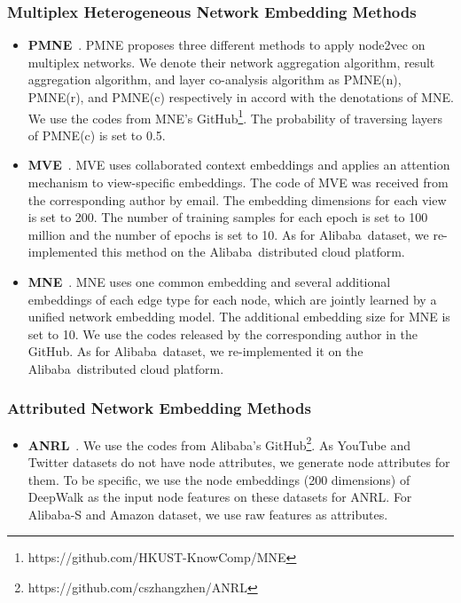 \documentclass[sigconf]{acmart}
\newcommand{\company}{Alibaba}
\begin{document}
\subsubsection{Multiplex Heterogeneous Network Embedding Methods}
\begin{itemize}
  \item \textbf{PMNE}~\cite{liu2017principled}. PMNE proposes three different methods to apply node2vec on multiplex networks. We denote their network aggregation algorithm, result aggregation algorithm, and layer co-analysis algorithm as PMNE(n), PMNE(r), and PMNE(c) respectively in accord with the denotations of MNE\cite{ijcai2018-428}. We use the codes from MNE's GitHub\footnote{\label{fn:mne}https://github.com/HKUST-KnowComp/MNE}. The probability of traversing layers of PMNE(c) is set to 0.5. 
  \item \textbf{MVE}~\cite{qu2017attention}. MVE uses collaborated context embeddings and applies an attention mechanism to view-specific embeddings. The code of MVE was received from the corresponding author by email. The embedding dimensions for each view is set to 200. The number of training samples for each epoch is set to 100 million and the number of epochs is set to 10. As for \company\ dataset, we re-implemented this method on the \company\ distributed cloud platform. 
\item \textbf{MNE}~\cite{ijcai2018-428}. MNE uses one common embedding and several additional embeddings of each edge type for each node, which are jointly learned by a unified network embedding model. The additional embedding size for MNE is set to 10. We use the codes released by the corresponding author in the GitHub. As for \company\ dataset, we re-implemented it on the \company\ distributed cloud platform. 

\end{itemize}

\subsubsection{Attributed Network Embedding Methods}
\begin{itemize}
  \item \textbf{ANRL}~\cite{zhang2018anrl}. We use the codes from Alibaba's GitHub\footnote{https://github.com/cszhangzhen/ANRL}. As YouTube and Twitter datasets do not have node attributes, we generate node attributes for them. To be specific, we use the node embeddings (200 dimensions) of DeepWalk as the input node features on these datasets for ANRL. For \company-S and Amazon dataset, we use raw features as attributes. 
\end{itemize}
\end{document}
